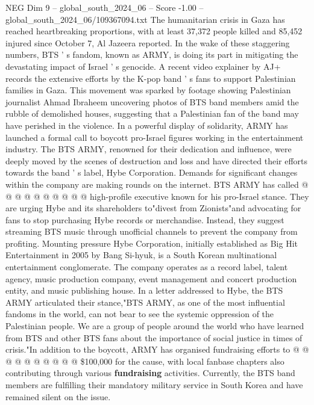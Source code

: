 \begin{textsample}{NEG Dim 9 – global\_south\_2024\_06 – Score -1.00 – global\_south\_2024\_06/109367094.txt}  \label{ex:f9_neg_398}
The humanitarian crisis in Gaza has reached heartbreaking proportions, with at least 37,372 people killed and 85,452 injured since October 7, Al Jazeera reported.
In the wake of these staggering numbers, BTS ' s fandom, known as ARMY, is doing its part in mitigating the devastating impact of Israel ' s genocide.
A recent video explainer by AJ+ records the extensive efforts by the K-pop band ' s fans to support Palestinian families in Gaza.
This movement was sparked by footage showing Palestinian journalist Ahmad Ibraheem uncovering photos of BTS band members amid the rubble of demolished houses, suggesting that a Palestinian fan of the band may have perished in the violence.
In a powerful display of solidarity, ARMY has launched a formal call to boycott pro-Israel figures working in the entertainment industry.
The BTS ARMY, renowned for their dedication and influence, were deeply moved by the scenes of destruction and loss and have directed their efforts towards the band ' s label, Hybe Corporation.
Demands for significant changes within the company are making rounds on the internet.
BTS ARMY has called @ @ @ @ @ @ @ @ @ @ high-profile executive known for his pro-Israel stance.
They are urging Hybe and its shareholders to"divest from Zionists"and advocating for fans to stop purchasing Hybe records or merchandise.
Instead, they suggest streaming BTS music through unofficial channels to prevent the company from profiting.
Mounting pressure Hybe Corporation, initially established as Big Hit Entertainment in 2005 by Bang Si-hyuk, is a South Korean multinational entertainment conglomerate.
The company operates as a record label, talent agency, music production company, event management and concert production entity, and music publishing house.
In a letter addressed to Hybe, the BTS ARMY articulated their stance,"BTS ARMY, as one of the most influential fandoms in the world, can not bear to see the systemic oppression of the Palestinian people.
We are a group of people around the world who have learned from BTS and other BTS fans about the importance of social justice in times of crisis."In addition to the boycott, ARMY has organised fundraising efforts to @ @ @ @ @ @ @ @ @ @ \$100,000 for the cause, with local fanbase chapters also contributing through various \textbf{fundraising} activities.
Currently, the BTS band members are fulfilling their mandatory military service in South Korea and have remained silent on the issue.

\end{textsample}
